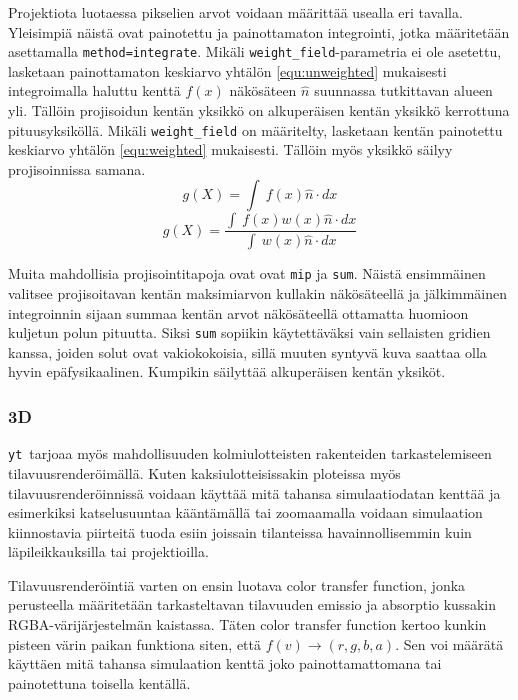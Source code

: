 \documentclass[12pt,a4paper]{article}
\newcommand{\yt}{\texttt{yt}}
\begin{document}
\begin{sloppypar}Projektiota luotaessa pikselien arvot voidaan määrittää usealla eri tavalla. Yleisimpiä näistä ovat painotettu ja painottamaton integrointi, jotka määritetään asettamalla \texttt{method=integrate}. Mikäli \texttt{weight\_field}-parametria ei ole asetettu, lasketaan painottamaton keskiarvo yhtälön \ref{equ:unweighted} mukaisesti integroimalla haluttu kenttä $f(x)$ näkösäteen $\hat{n}$ suunnassa tutkittavan alueen yli. Tällöin projisoidun kentän yksikkö on alkuperäisen kentän yksikkö kerrottuna pituusyksiköllä. Mikäli \texttt{weight\_field} on määritelty, lasketaan kentän painotettu keskiarvo yhtälön \ref{equ:weighted} mukaisesti. Tällöin myös yksikkö säilyy projisoinnissa samana. \cite{sliceproj}
\begin{equation}\label{equ:unweighted}
	g(X) = {\int\ {f(x)\hat{n}\cdot{dx}}}
\end{equation}
\begin{equation}\label{equ:weighted}
	g(X) = \frac{\int\ {f(x)w(x)\hat{n}\cdot{dx}}}{\int\ {w(x)\hat{n}\cdot{dx}}}
\end{equation}
\end{sloppypar} 

Muita mahdollisia projisointitapoja ovat ovat \texttt{mip} ja \texttt{sum}. Näistä ensimmäinen valitsee projisoitavan kentän maksimiarvon kullakin näkösäteellä ja jälkimmäinen integroinnin sijaan summaa kentän arvot näkösäteellä ottamatta huomioon kuljetun polun pituutta. Siksi \texttt{sum} sopiikin käytettäväksi vain sellaisten gridien kanssa, joiden solut ovat vakiokokoisia, sillä muuten syntyvä kuva saattaa olla hyvin epäfysikaalinen. Kumpikin säilyttää alkuperäisen kentän yksiköt. \cite{sliceproj, projection}

\subsubsection{3D}
\yt\ tarjoaa myös mahdollisuuden kolmiulotteisten rakenteiden tarkastelemiseen tilavuusrenderöimällä. Kuten kaksiulotteisissakin ploteissa myös tilavuusrenderöinnissä voidaan käyttää mitä tahansa simulaatiodatan kenttää ja esimerkiksi katselusuuntaa kääntä\-mällä tai zoomaamalla voidaan simulaation kiinnostavia piirteitä tuoda esiin joissain tilanteissa havainnollisemmin kuin läpileikkauksilla tai projektioilla. \cite{volume}

Tilavuusrenderöintiä varten on ensin luotava color transfer function, jonka perusteella määritetään tarkasteltavan tilavuuden emissio ja absorptio kussakin RGBA-väri\-järjes\-telmän kaistassa. Täten color transfer function kertoo kunkin pisteen värin paikan funktiona siten, että $f(v) \rightarrow (r, g, b, a)$. Sen voi määrätä käyttäen mitä tahansa simulaation kenttä joko painottamattomana tai painotettuna toisella kentällä. \cite{volume}
\end{document}
